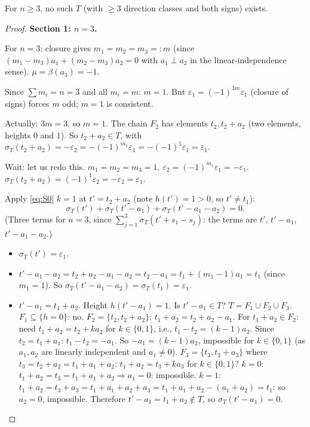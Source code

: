 \begin{lemma}\label{lem:main}
For $n \geq 3$, no such $T$ (with $\geq 3$ direction classes and both signs) exists.
\end{lemma}
\begin{proof}

\medskip
\noindent\textbf{Section 1: $n = 3$.}

For $n = 3$: closure gives $m_1 = m_2 = m_3 =: m$ (since $(m_1-m_3)a_1 + (m_2-m_3)a_2 = 0$
with $a_1 \perp a_2$ in the linear-independence sense).  $\mu = \beta(a_3) = -1$.

Since $\sum m_i = n = 3$ and all $m_i = m$: $m = 1$.  But $\varepsilon_1 = (-1)^{3m}\varepsilon_1$ (closure of signs) forces $m$ odd; $m = 1$ is consistent.

Actually: $3m = 3$, so $m = 1$.  The chain $F_2$ has elements $t_2, t_2 + a_2$ (two elements, heights $0$ and $1$).  So $t_2 + a_2 \in T$, with $\sigma_T(t_2 + a_2) = -\varepsilon_2 = -(-1)^{m_1}\varepsilon_1 = -(-1)^1\varepsilon_1 = \varepsilon_1$.

Wait: let us redo this.  $m_1 = m_2 = m_3 = 1$.  $\varepsilon_2 = (-1)^{m_1}\varepsilon_1 = -\varepsilon_1$.
$\sigma_T(t_2 + a_2) = (-1)^1 \varepsilon_2 = -\varepsilon_2 = \varepsilon_1$.

Apply \eqref{eq:S0} $k=1$ at $t' = t_2 + a_2$ (note $h(t')=1 > 0$, so $t' \neq t_1$):
\[
  \sigma_T(t') + \sigma_T(t' - a_1) + \sigma_T(t' - a_1 - a_2) = 0.
\]
(Three terms for $n=3$, since $\sum_{j=1}^3 \sigma_T(t' + s_1 - s_j)$: the terms are $t'$, $t' - a_1$, $t' - a_1 - a_2$.)

\begin{itemize}
\item $\sigma_T(t') = \varepsilon_1$.
\item $t' - a_1 - a_2 = t_2 + a_2 - a_1 - a_2 = t_2 - a_1 = t_1 + (m_1 - 1)a_1 = t_1$ (since $m_1=1$).
  So $\sigma_T(t' - a_1 - a_2) = \sigma_T(t_1) = \varepsilon_1$.
\item $t' - a_1 = t_1 + a_2$.  Height $h(t'-a_1) = 1$.
  Is $t' - a_1 \in T$? $T = F_1 \cup F_2 \cup F_3$.  $F_1 \subseteq \{h=0\}$: no.
  $F_2 = \{t_2, t_2+a_2\}$: $t_1+a_2 = t_2+a_2 - a_1$.  For $t_1+a_2 \in F_2$:
  need $t_1 + a_2 = t_2 + k a_2$ for $k \in \{0,1\}$, i.e., $t_1 - t_2 = (k-1)a_2$.
  Since $t_2 = t_1 + a_1$: $t_1 - t_2 = -a_1$.  So $-a_1 = (k-1)a_2$, impossible
  for $k \in \{0,1\}$ (as $a_1, a_2$ are linearly independent and $a_1 \neq 0$).
  $F_3 = \{t_3, t_3+a_3\}$ where $t_3 = t_2 + a_2 = t_1 + a_1 + a_2$:
  $t_1+a_2 = t_3 + k a_3$ for $k \in \{0,1\}$?
  $k=0$: $t_1+a_2 = t_3 = t_1+a_1+a_2 \Rightarrow a_1=0$: impossible.
  $k=1$: $t_1+a_2 = t_3+a_3 = t_1+a_1+a_2+a_3 = t_1+a_1+a_2-(a_1+a_2) = t_1$: so $a_2=0$, impossible.
  Therefore $t'-a_1 = t_1+a_2 \notin T$, so $\sigma_T(t'-a_1) = 0$.
\end{itemize}


\end{proof}
